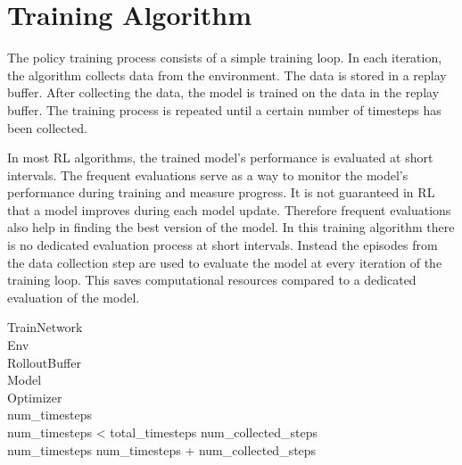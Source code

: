 \section{Training Algorithm}



The policy training process consists of a simple training loop. In each iteration, the algorithm collects data from the environment. The data is stored in a replay buffer. After collecting the data, the model is trained on the data in the replay buffer. The training process is repeated until a certain number of timesteps has been collected.  

In most \ac{RL} algorithms, the trained model's performance is evaluated at short intervals. The frequent evaluations serve as a way to monitor the model's performance during training and measure progress. It is not guaranteed in \ac{RL} that a model improves during each model update. Therefore frequent evaluations also help in finding the best version of the model.  
In this training algorithm there is no dedicated evaluation process at short intervals. Instead the episodes from the data collection step are used to evaluate the model at every iteration of the training loop. This saves computational resources compared to a dedicated evaluation of the model.

\renewcommand{\thepseudonum}{\roman{pseudonum}}
\begin{pseudocode}{TrainNetwork}{ }
\label{train_network}
\\

\MAIN
Env \GETS {}\\
RolloutBuffer \GETS {}\\
Model \GETS {}\\
Optimizer \GETS {}\\

num\_timesteps \\
\WHILE num\_timesteps < total\_timesteps \DO 
\BEGIN 
num\_collected\_steps \GETS {}\\
num\_timesteps \GETS num\_timesteps + num\_collected\_steps\\
\\
\END\\
\ENDMAIN
\end{pseudocode}

